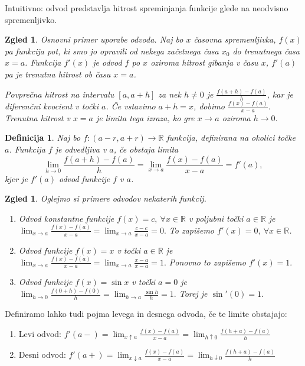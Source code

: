 \documentclass[10pt, a4paper]{article}
\newtheorem{defi}[izr]{Definicija}
\newenvironment{noticeB}{%
  \tcolorbox[%
  notitle,
  empty,
  enhanced,  %
  breakable,
  coltext=black,
  colback=white, 
  fontupper=\rmfamily,
  noparskip,
  sharp corners,
  boxrule=-1pt,  %
  frame hidden,
  left=7pt,  %
  right=7pt,
  top=5pt,
  bottom=5pt,
  before skip=2.5ex plus 2pt,
  after skip=2.5ex plus 2pt,
  borderline west = {1.5pt}{-0.1pt}{blue!30!black}, %
  overlay unbroken and last={%
    \draw[color=black, line width=1.25pt]
    ($(frame.south west)+(1.pt, -0.1pt)$) -- ++(2em, 0);
  }
  ]}
{\endtcolorbox}
\newenvironment{definicija}{\begin{noticeB}\begin{defi}}{%
\end{defi}\end{noticeB}}
\newtheorem{zgled}[izr]{Zgled}
\newcommand{\R}{\mathbb {R}}
\newcommand{\limf}[3]{\lim_{#1 \to #2} {#3}}
\newcommand{\rlimf}[3]{\lim_{#1 \downarrow #2} {#3}}
\newcommand{\llimf}[3]{\lim_{#1 \uparrow #2} {#3}}
\begin{document}
Intuitivno: odvod predstavlja hitrost spreminjanja funkcije glede na neodvisno spremenljivko.

\begin{zgled}
    Osnovni primer uporabe odvoda.      
    Naj bo $x$ časovna spremenljivka, $f(x)$ pa funkcija pot, ki smo jo opravili od nekega začetnega časa $x_0$ do trenutnega časa $x = a$.
    Funkcija $f'(x)$ je odvod $f$ po $x$ oziroma hitrost gibanja v času $x$, $f'(a)$ pa je trenutna hitrost ob času $x = a$.

    Povprečna hitrost na intervalu $[a, a+h]$ za nek $h \neq 0$ je 
    $\frac{f(a+h) - f(a)}{h}$, kar je diferenčni kvocient v točki $a$. 
    Če vstavimo $a+h = x$, dobimo $\frac{f(x) - f(a)}{x - a}$. 
    Trenutna hitrost v $x = a$ je limita tega izraza, ko gre $x \rightarrow a$ oziroma
    $h\rightarrow 0.$ 
\end{zgled}

\begin{definicija}
    Naj bo $f: (a - r, a+ r) \rightarrow \R$ funkcija, definirana na okolici točke $a$.
    Funkcija $f$ je odvedljiva v $a$, če obstaja limita
    \begin{equation*}
        \limf{h}{0}{\frac{f(a+h) - f(a)}{h}} = \limf{x}{a}{\frac{f(x) - f(a)}{x-a}} = f'(a),
    \end{equation*}
    kjer je $f'(a)$ odvod funkcije $f$ v $a$.
\end{definicija}

\begin{zgled}
    Oglejmo si primere odvodov nekaterih funkcij.
    \begin{enumerate}
        \item Odvod konstantne funkcije $f(x) = c,\ \forall x \in \R$ v poljubni točki $a \in \R$ je 
        $\limf{x}{a}{\frac{f(x) - f(a)}{x-a}} = \limf{x}{a}{\frac{c-c}{x-a}} = 0.$
        To zapišemo $f'(x) = 0,\ \forall x \in \R$.
        \item Odvod funkcije $f(x) = x$ v točki $a \in \R$ je $\limf{x}{a}{\frac{f(x)- f(a)}{x-a}} = \limf{x}{a}{\frac{x-a}{x-a}} = 1.$
        Ponovno to zapišemo $f'(x) = 1.$
        \item Odvod funkcije $f(x) = \sin{x}$ v točki $a = 0$ je $\limf{h}{0}{\frac{f(0+h) - f(0)}{h}} = \limf{h}{a}{\frac{\sin{h}}{h}} = 1.$ 
        Torej je $\sin'{(0)} = 1.$
    \end{enumerate}
\end{zgled}

Definiramo lahko tudi pojma levega in desnega odvoda, če te limite obstajajo:
\begin{enumerate}
    \item Levi odvod: $\displaystyle f'(a-) = \llimf{x}{a}{\frac{f(x) - f(a)}{x-a}} = \llimf{h}{0}{\frac{f(h+a) - f(a)}{h}}$
    \item Desni odvod: $\displaystyle f'(a+) = \rlimf{x}{a}{\frac{f(x) - f(a)}{x-a}} = \rlimf{h}{0}{\frac{f(h+a) - f(a)}{h}}$
\end{enumerate}
\end{document}
